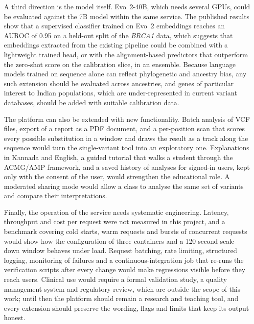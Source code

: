 A third direction is the model itself. Evo~2-40B, which needs several GPUs, could be evaluated against the 7B model within the same service. The published results show that a supervised classifier trained on Evo~2 embeddings reaches an AUROC of 0.95 on a held-out split of the \textit{BRCA1} data, which suggests that embeddings extracted from the existing pipeline could be combined with a lightweight trained head, or with the alignment-based predictors that outperform the zero-shot score on the calibration slice, in an ensemble. Because language models trained on sequence alone can reflect phylogenetic and ancestry bias, any such extension should be evaluated across ancestries, and genes of particular interest to Indian populations, which are under-represented in current variant databases, should be added with suitable calibration data.

The platform can also be extended with new functionality. Batch analysis of VCF files, export of a report as a PDF document, and a per-position scan that scores every possible substitution in a window and draws the result as a track along the sequence would turn the single-variant tool into an exploratory one. Explanations in Kannada and English, a guided tutorial that walks a student through the ACMG/AMP framework, and a saved history of analyses for signed-in users, kept only with the consent of the user, would strengthen the educational role. A moderated sharing mode would allow a class to analyse the same set of variants and compare their interpretations.

Finally, the operation of the service needs systematic engineering. Latency, throughput and cost per request were not measured in this project, and a benchmark covering cold starts, warm requests and bursts of concurrent requests would show how the configuration of three containers and a 120-second scale-down window behaves under load. Request batching, rate limiting, structured logging, monitoring of failures and a continuous-integration job that re-runs the verification scripts after every change would make regressions visible before they reach users. Clinical use would require a formal validation study, a quality management system and regulatory review, which are outside the scope of this work; until then the platform should remain a research and teaching tool, and every extension should preserve the wording, flags and limits that keep its output honest.
